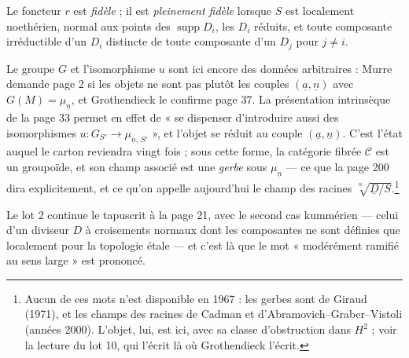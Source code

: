 \documentclass[11pt,a4paper]{article}
\begin{document}
Le foncteur $r$ est \emph{fidèle} ; il est \emph{pleinement fidèle} lorsque
$S$ est localement noethérien, normal aux points des
$\operatorname{supp} D_{i}$, les $D_{i}$ réduits, et toute composante
irréductible d'un $D_{i}$ distincte de toute composante d'un $D_{j}$ pour
$j \neq i$.

Le groupe $G$ et l'isomorphisme $u$ sont ici encore des données arbitraires :
Murre demande page 2 si les objets ne sont pas plutôt les couples
$(\underline{a}, \underline{n})$ avec $G(M) = \mu_{\underline{n}}$, et
Grothendieck le confirme page 37. La présentation intrinsèque de la page 33
permet en effet de « se dispenser d'introduire aussi des isomorphismes
$u : G_{S'} \to \mu_{\underline{n},\,S'}$ », et l'objet se réduit au couple
$(\underline{a}, \underline{n})$. C'est l'état auquel le carton reviendra vingt
fois ; sous cette forme, la catégorie fibrée $\mathcal{C}$ est un groupoïde,
et son champ associé est une \emph{gerbe} sous $\mu_{\underline{n}}$ --- ce que
la page 200 dira explicitement, et ce qu'on appelle aujourd'hui le champ des
racines $\sqrt[\underline{n}]{\underline{D}/S}$.\footnote{Aucun de ces mots
n'est disponible en 1967 : les gerbes sont de Giraud (1971), et les champs des
racines de Cadman et d'Abramovich--Graber--Vistoli (années 2000). L'objet, lui,
est ici, avec sa classe d'obstruction dans $H^{2}$ ; voir la lecture du lot 10,
qui l'écrit là où Grothendieck l'écrit.}

Le lot 2 continue le tapuscrit à la page 21, avec le second cas kummérien
--- celui d'un diviseur $D$ à croisements normaux dont les composantes ne sont
définies que localement pour la topologie étale --- et c'est là que le mot
« modérément ramifié au sens large » est prononcé.
\end{document}
